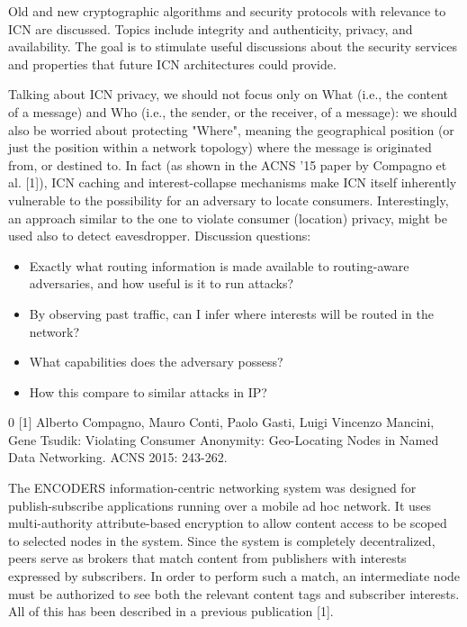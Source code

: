 \documentclass[a4paper,UKenglish]{dagrep}
\begin{document}
Old and new cryptographic algorithms and security protocols with relevance to ICN are discussed. Topics include integrity and authenticity, privacy, and availability. The goal is to stimulate useful discussions about the security services and properties that future ICN architectures could provide.

\license

Talking about ICN privacy, we should not focus only on What (i.e., the content of a message) and Who (i.e., the sender, or the receiver, of a message): we should also be worried about protecting "Where", meaning the geographical position (or just the position within a network topology) where the message is originated from, or destined to. In fact (as shown in the ACNS '15 paper by Compagno et al. [1]), ICN caching and interest-collapse mechanisms make ICN itself inherently vulnerable to the possibility for an adversary to locate consumers.
Interestingly, an approach similar to the one to violate consumer (location) privacy, might be used also to detect eavesdropper.
Discussion questions:
\begin{itemize}
\item Exactly what routing information is made available to routing-aware adversaries, and  how useful is it to run attacks? 
\item By observing past traffic, can I infer where interests will be routed in the network? 
\item What capabilities does the adversary possess? 
\item How this compare to similar attacks in IP?
\end{itemize}

\begin{thebibliography}{0}
[1] Alberto Compagno, Mauro Conti, Paolo Gasti, Luigi Vincenzo Mancini, Gene Tsudik:
Violating Consumer Anonymity: Geo-Locating Nodes in Named Data Networking. ACNS 2015: 243-262.
\end{thebibliography}

\license

The ENCODERS information-centric networking system was designed for publish-subscribe applications running over a mobile ad hoc network. It uses multi-authority attribute-based encryption to allow content access to be scoped to selected nodes in the system. Since the system is completely decentralized, peers serve as brokers that match content from publishers with interests expressed by subscribers. In order to perform such a match, an intermediate node must be authorized to see both the relevant content tags and  subscriber interests. All of this has been described in a previous publication [1].
\end{document}
